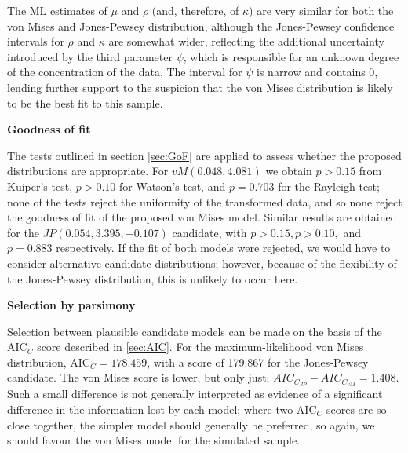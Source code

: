 \documentclass[../../ArchStats.tex]{subfiles}
\begin{document}
The ML estimates of $\mu$ and $\rho$ (and, therefore, of $\kappa$) are very similar for both the von Mises and Jones-Pewsey distribution, although the Jones-Pewsey confidence intervals for $\rho$ and $\kappa$ are somewhat wider, reflecting the additional uncertainty introduced by the third parameter $\psi$, which is responsible for an unknown degree of the concentration of the data. The interval for $\psi$ is narrow and contains 0, lending further support to the suspicion that the von Mises distribution is likely to be the best fit to this sample.
    
\textbf{Goodness of fit}

The tests outlined in section \ref{sec:GoF} are applied to assess whether the proposed distributions are appropriate. For $vM(0.048, 4.081)$ we obtain $p > 0.15$ from Kuiper's test, $p > 0.10$ for Watson's test, and $p = 0.703$ for the Rayleigh test; none of the tests reject the uniformity of the transformed data, and so none reject the goodness of fit of the proposed von Mises model. Similar results are obtained for the $JP(0.054, 3.395, -0.107)$ candidate, with $p > 0.15, p > 0.10,$ and $p=0.883$ respectively. If the fit of both models were rejected, we would have to consider alternative candidate distributions; however, because of the flexibility of the Jones-Pewsey distribution, this is unlikely to occur here.

\textbf{Selection by parsimony}

Selection between plausible candidate models can be made on the basis of the AIC$_C$ score described in \ref{sec:AIC}. For the maximum-likelihood von Mises distribution, AIC$_C = 178.459$, with a score of 179.867 for the Jones-Pewsey candidate. The von Mises score is lower, but only just; $AIC_{C_{JP}} - AIC_{C_{vM}}  = 1.408$. Such a small difference is not generally interpreted as evidence of a significant difference in the information lost by each model; where two AIC$_C$ scores are so close together, the simpler model should generally be preferred, so again, we should favour the von Mises model for the simulated sample.
\end{document}
